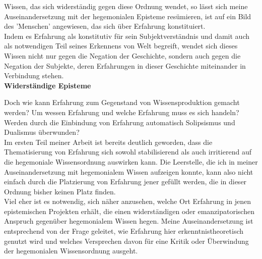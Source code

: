 \noindent Wissen, das sich widerständig gegen diese Ordnung wendet, so lässt sich meine
Auseinandersetzung mit der hegemonialen Episteme resümieren, ist auf ein Bild
des 'Menschen' angewiesen, das sich über Erfahrung konstituiert. \\
Indem es
Erfahrung als konstitutiv für sein Subjektverständnis und damit auch als
notwendigen Teil seines Erkennens von Welt begreift, wendet sich dieses Wissen
nicht nur gegen die Negation der Geschichte, sondern auch gegen die Negation der
Subjekte, deren Erfahrungen in dieser Geschichte miteinander in Verbindung
stehen.\\ 

\noindent\textbf{\large Widerständige Episteme}

\noindent Doch wie kann Erfahrung zum Gegenstand von Wissensproduktion gemacht werden? Um
wessen Erfahrung und welche Erfahrung muss es sich handeln? Werden durch die
Einbindung von Erfahrung automatisch Solipsismus und Dualismus überwunden?\\

\noindent Im
ersten Teil meiner Arbeit ist bereits deutlich geworden, dass die Thematisierung
von Erfahrung sich sowohl stabilisierend als auch irritierend auf die
hegemoniale Wissensordnung auswirken kann. Die Leerstelle, die ich in meiner
Auseinandersetzung mit hegemonialem Wissen aufzeigen konnte, kann also nicht
einfach durch die Platzierung von Erfahrung jener gefüllt werden, die in dieser
Ordnung bisher keinen Platz finden. \\
Viel eher ist es notwendig, sich näher
anzusehen, welche Ort Erfahrung in jenen epistemischen Projekten erhält, die
einen widerständigen oder emanzipatorischen Anspruch gegenüber hegemonialem
Wissen hegen. Meine Auseinandersetzung ist entsprechend von der Frage geleitet,
wie Erfahrung hier erkenntnistheoretisch genutzt wird und welches Versprechen
davon für eine Kritik oder Überwindung der hegemonialen Wissensordnung ausgeht.\\


